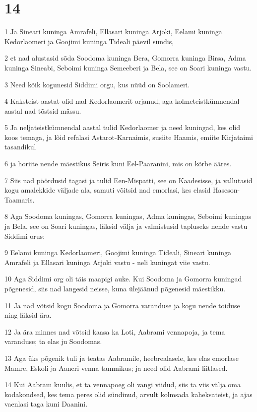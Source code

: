 \chapter{14}

\par 1 Ja Sineari kuninga Amrafeli, Ellasari kuninga Arjoki, Eelami kuninga Kedorlaomeri ja Goojimi kuninga Tideali päevil sündis,
\par 2 et nad alustasid sõda Soodoma kuninga Bera, Gomorra kuninga Birsa, Adma kuninga Sineabi, Seboimi kuninga Semeeberi ja Bela, see on Soari kuninga vastu.
\par 3 Need kõik kogunesid Siddimi orgu, kus nüüd on Soolameri.
\par 4 Kaksteist aastat olid nad Kedorlaomerit orjanud, aga kolmeteistkümnendal aastal nad tõstsid mässu.
\par 5 Ja neljateistkümnendal aastal tulid Kedorlaomer ja need kuningad, kes olid koos temaga, ja lõid refalasi Astarot-Karnaimis, susiite Haamis, emiite Kirjataimi tasandikul
\par 6 ja horiite nende mäestikus Seiris kuni Eel-Paaranini, mis on kõrbe ääres.
\par 7 Siis nad pöördusid tagasi ja tulid Een-Mispatti, see on Kaadesisse, ja vallutasid kogu amalekkide väljade ala, samuti võitsid nad emorlasi, kes elasid Haseson-Taamaris.
\par 8 Aga Soodoma kuningas, Gomorra kuningas, Adma kuningas, Seboimi kuningas ja Bela, see on Soari kuningas, läksid välja ja valmistusid tapluseks nende vastu Siddimi orus:
\par 9 Eelami kuninga Kedorlaomeri, Goojimi kuninga Tideali, Sineari kuninga Amrafeli ja Ellasari kuninga Arjoki vastu - neli kuningat viie vastu.
\par 10 Aga Siddimi org oli täis maapigi auke. Kui Soodoma ja Gomorra kuningad põgenesid, siis nad langesid neisse, kuna ülejäänud põgenesid mäestikku.
\par 11 Ja nad võtsid kogu Soodoma ja Gomorra varanduse ja kogu nende toiduse ning läksid ära.
\par 12 Ja ära minnes nad võtsid kaasa ka Loti, Aabrami vennapoja, ja tema varanduse; ta elas ju Soodomas.
\par 13 Aga üks põgenik tuli ja teatas Aabramile, heebrealasele, kes elas emorlase Mamre, Eskoli ja Aaneri venna tammikus; ja need olid Aabrami liitlased.
\par 14 Kui Aabram kuulis, et ta vennapoeg oli vangi viidud, siis ta viis välja oma kodakondsed, kes tema peres olid sündinud, arvult kolmsada kaheksateist, ja ajas vaenlasi taga kuni Daanini.
